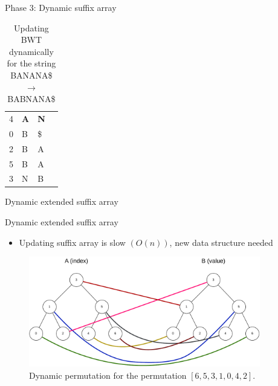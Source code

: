 \documentclass[aspectratio=1610, xcolor=table]{beamer}
\begin{document}
\begin{frame}[fragile]{Phase 3: Dynamic suffix array}
\begin{table}
\begin{center}
{\begin{tabular}{c | l | l l}
					4     & \textbf{A} & \textbf{N} &                                 \\
					0     & B          & \$         &                                 \\
					2     & B          & A          &                                 \\
					5     & B          & A          &                                 \\
					3     & N          & B          &                                 \\
				\end{tabular}
			}
			\caption{Updating BWT dynamically for the string BANANA\$ $\rightarrow$ BABNANA\$}
			\label{table:bwtupdatestages}
		\end{center}
	\end{table}
\end{frame}

\begin{frame}[fragile]{Dynamic extended suffix array}
\end{frame}

\begin{frame}[fragile]{Dynamic extended suffix array}
    \begin{itemize}
        \item Updating suffix array is slow $(O(n))$, new data structure needed
    \end{itemize}
	\begin{figure}[t]
		\begin{center}
			\includegraphics[width=0.9\textwidth]{figures/dynamicpermutation.drawio.pdf}
		\end{center}
		\caption{Dynamic permutation for the permutation $[6,5,3,1,0,4,2]$.}
		\label{fig:dynamicpermutation}
	\end{figure}
\end{frame}
\end{document}
